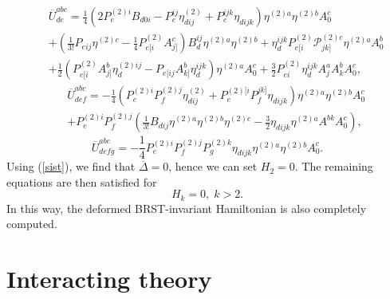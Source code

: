 \documentclass[a4paper,12pt]{article}
\begin{document}
\begin{eqnarray}
&&\overline{U}_{de}^{abc}=\frac{1}{4}\left(
2P_{e}^{(2)i}B_{d0i}-P_{e}^{ij}\eta _{dij}^{(2)}+P_{e}^{ijk}\eta
_{dijk}\right) \eta ^{(2)a}\eta ^{(2)b}A_{0}^{c}  \nonumber \\
&&+\left( \frac{1}{3!}P_{eij}\eta ^{(2)c}- \frac{1}{4}%
P_{e[i}^{(2)}A_{j]}^{c}\right) B_{d}^{ij}\eta ^{(2)a}\eta ^{(2)b}+\eta
_{d}^{ijk}P_{e[i}^{(2)}\mathcal{P}_{jk]}^{(2)c}\eta ^{(2)a}A_{0}^{b} 
\nonumber \\
&&+\frac{1}{2}\left( P_{e[i}^{(2)}A_{j]}^{b}\eta
_{d}^{(2)ij}-P_{e[ij}A_{k]}^{b}\eta _{d}^{ijk}\right) \eta ^{(2)a}A_{0}^{c}+%
\frac{3}{2}P_{ei}^{(2)}\eta _{d}^{ijk}A_{j}^{a}A_{k}^{b}A_{0}^{c},
\label{xx87}
\end{eqnarray}
\begin{eqnarray}
&&\overline{U}_{def}^{abc}= -\frac{1}{4}\left( P_{e}^{(2)i}P_{f}^{(2)j}\eta
_{dij}^{(2)}+P_{e}^{(2)[i}P_{f}^{jk]}\eta _{dijk}\right) \eta ^{(2)a}\eta
^{(2)b}A_{0}^{c}  \nonumber \\
&&+P_{e}^{(2)i}P_{f}^{(2)j}\left( \frac{1}{3!}B_{dij}\eta ^{(2)a}\eta
^{(2)b}\eta ^{(2)c}-\frac{3}{2}\eta _{dijk}\eta
^{(2)a}A^{bk}A_{0}^{c}\right) ,  \label{xx88}
\end{eqnarray}
\begin{equation}
\overline{U}_{defg}^{abc}=-\frac{1}{4}P_{e}^{(2)i}P_{f}^{(2)j}P_{g}^{(2)k}%
\eta _{dijk}\eta ^{(2)a}\eta ^{(2)b}A_{0}^{c}.  \label{xx89}
\end{equation}
Using (\ref{sist}), we find that $\overline{\Delta }=0$, hence we can set $%
H_{2}=0$. The remaining equations are then satisfied for 
\begin{equation}
H_{k}=0,\;k>2.  \label{xx90}
\end{equation}
In this way, the deformed BRST-invariant Hamiltonian is also completely
computed.

\section{Interacting theory}
\end{document}
